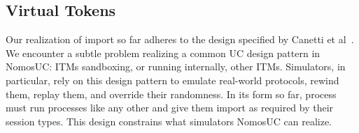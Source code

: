 %
%
%
%
%

\subsection{Virtual Tokens}
Our realization of import so far adheres to the design specified by Canetti et al~\cite{canettiUC}.
We encounter a subtle problem realizing a common UC design pattern in NomosUC: ITMs sandboxing, or running internally, other ITMs.
Simulators, in particular, rely on this design pattern to emulate real-world protocols, rewind them, replay them, and override their randomness.
In its form so far, process must run processes like any other and give them import as required by their session types.
This design constrains what simulators NomosUC can realize.

